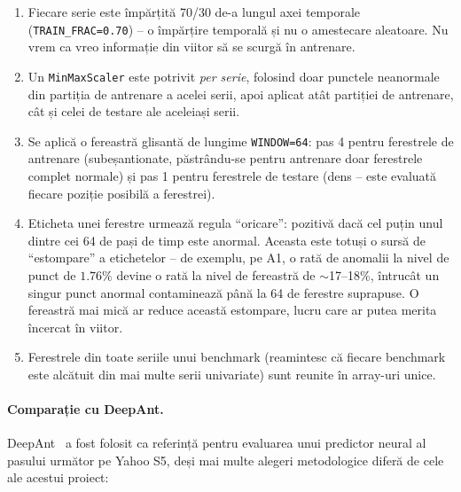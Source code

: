 \begin{enumerate}
  \item Fiecare serie este împărțită 70/30 de-a lungul axei temporale (\texttt{TRAIN\_FRAC=0.70}) -- o împărțire temporală și nu o amestecare aleatoare. Nu vrem ca vreo informație din viitor să se scurgă în antrenare.
  \item Un \texttt{MinMaxScaler} este potrivit \emph{per serie}, folosind doar punctele neanormale din partiția de antrenare a acelei serii, apoi aplicat atât partiției de antrenare, cât și celei de testare ale aceleiași serii.
  \item Se aplică o fereastră glisantă de lungime \texttt{WINDOW=64}: pas 4 pentru ferestrele de antrenare (subeșantionate, păstrându-se pentru antrenare doar ferestrele complet normale) și pas 1 pentru ferestrele de testare (dens -- este evaluată fiecare poziție posibilă a ferestrei).
  \item Eticheta unei ferestre urmează regula \enquote{oricare}: pozitivă dacă cel puțin unul dintre cei 64 de pași de timp este anormal. Aceasta este totuși o sursă de \enquote{estompare} a etichetelor -- de exemplu, pe A1, o rată de anomalii la nivel de punct de $1.76\%$ devine o rată la nivel de fereastră de $\sim$17--18\%, întrucât un singur punct anormal contaminează până la 64 de ferestre suprapuse. O fereastră mai mică ar reduce această estompare, lucru care ar putea merita încercat în viitor.
  \item Ferestrele din toate seriile unui benchmark (reamintesc că fiecare benchmark este alcătuit din mai multe serii univariate) sunt reunite în array-uri unice.
\end{enumerate}

\paragraph{Comparație cu DeepAnt.} DeepAnt~\parencite{munir2019deepant} a fost folosit ca referință pentru evaluarea unui predictor neural al pasului următor pe Yahoo S5, deși mai multe alegeri metodologice diferă de cele ale acestui proiect:

